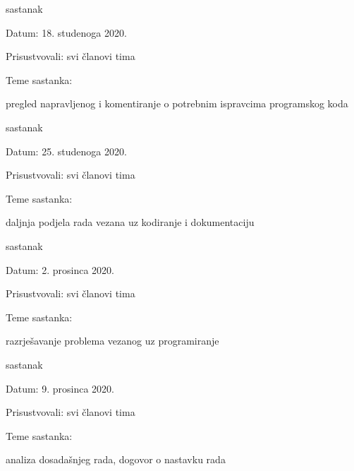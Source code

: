 \begin{packed_enum}
			\item  sastanak
			\item[] \begin{packed_item}
				\item Datum: 18. studenoga 2020. 
				\item Prisustvovali: svi članovi tima
				\item Teme sastanka:
				\begin{packed_item}
					\item  pregled napravljenog i komentiranje o potrebnim ispravcima programskog koda
				\end{packed_item}
			\end{packed_item}
			\eject
			\item  sastanak
			\item[] \begin{packed_item}
				\item Datum: 25. studenoga 2020. 
				\item Prisustvovali: svi članovi tima
				\item Teme sastanka:
				\begin{packed_item}
					\item  daljnja podjela rada vezana uz kodiranje i dokumentaciju
				\end{packed_item}
			\end{packed_item}
			
			\item  sastanak
			\item[] \begin{packed_item}
				\item Datum: 2. prosinca 2020. 
				\item Prisustvovali: svi članovi tima
				\item Teme sastanka:
				\begin{packed_item}
					\item  razrješavanje problema vezanog uz programiranje
				\end{packed_item}
			\end{packed_item}
			
			\item  sastanak
			\item[] \begin{packed_item}
				\item Datum: 9. prosinca 2020. 
				\item Prisustvovali: svi članovi tima
				\item Teme sastanka:
				\begin{packed_item}
					\item  analiza dosadašnjeg rada, dogovor o nastavku rada
				\end{packed_item}
			\end{packed_item}
			

\end{packed_enum}
